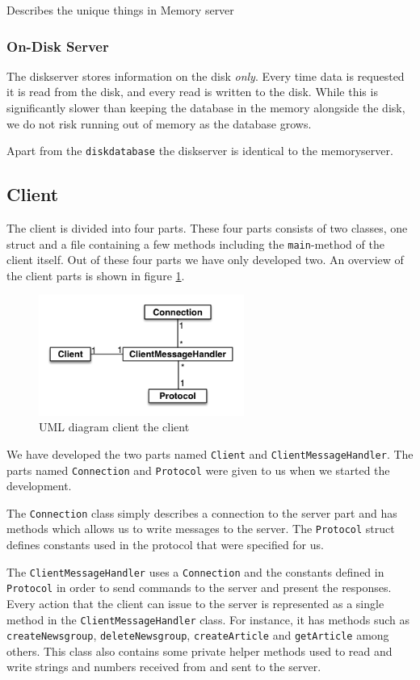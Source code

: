 \documentclass[a4paper]{article}
\begin{document}
Describes the unique things in Memory server


\subsubsection{On-Disk Server}
The diskserver stores information on the disk \emph{only}. Every time data is requested it is read from the disk, and every read is written to the disk. While this is significantly slower than keeping the database in the memory alongside the disk, we do not risk running out of memory as the database grows.

Apart from the \texttt{diskdatabase} the diskserver is identical to the memoryserver. 


\subsection{Client}
The client is divided into four parts. These four parts consists of two classes, one struct and a file containing a few methods including the \texttt{main}-method of the client itself. Out of these four parts we have only developed two. An overview of the client parts is shown in figure \ref{clientUML}.

\begin{figure}
    \centering
    \includegraphics[width=0.6\textwidth]{projectUML-client.png}
    \caption{UML diagram client the client}
    \label{clientUML}
\end{figure}

We have developed the two parts named \texttt{Client} and \texttt{ClientMessageHandler}. The parts named \texttt{Connection} and \texttt{Protocol} were given to us when we started the development.

The \texttt{Connection} class simply describes a connection to the server part and has methods which allows us to write messages to the server. The \texttt{Protocol} struct defines constants used in the protocol that were specified for us.

The \texttt{ClientMessageHandler} uses a \texttt{Connection} and the constants defined in \texttt{Protocol} in order to send commands to the server and present the responses. Every action that the client can issue to the server is represented as a single method in the \texttt{ClientMessageHandler} class. For instance, it has methods such as \texttt{createNewsgroup}, \texttt{deleteNewsgroup}, \texttt{createArticle} and \texttt{getArticle} among others. This class also contains some private helper methods used to read and write strings and numbers received from and sent to the server.
\end{document}
